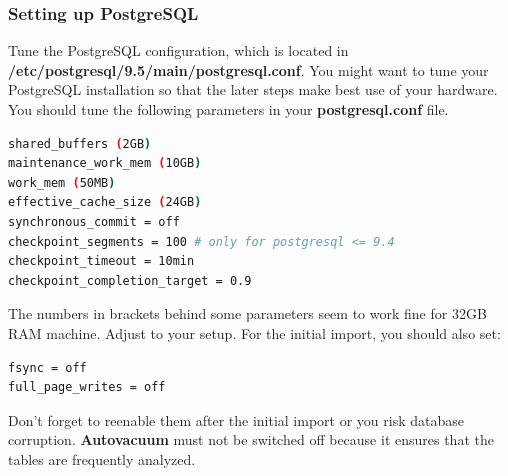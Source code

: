 \documentclass[12pt]{article}
\begin{document}
\subsubsection{Setting up PostgreSQL}
Tune the PostgreSQL configuration, which is located in\\ \textbf{/etc/postgresql/9.5/main/postgresql.conf}. You might want to tune your PostgreSQL installation so that the later steps make best use of your hardware. You should tune the following parameters in your \textbf{postgresql.conf} file.
\begin{lstlisting}[language=bash,breaklines=true]
shared_buffers (2GB)
maintenance_work_mem (10GB)
work_mem (50MB)
effective_cache_size (24GB)
synchronous_commit = off
checkpoint_segments = 100 # only for postgresql <= 9.4
checkpoint_timeout = 10min
checkpoint_completion_target = 0.9
\end{lstlisting}
The numbers in brackets behind some parameters seem to work fine for 32GB RAM machine.
Adjust to your setup.
For the initial import, you should also set:
\begin{lstlisting}[language=bash,breaklines=true]
fsync = off
full_page_writes = off
\end{lstlisting}
Don't forget to reenable them after the initial import or you risk database corruption.
\textbf{Autovacuum} must not be switched off because it ensures that the tables are frequently
analyzed.
\end{document}
